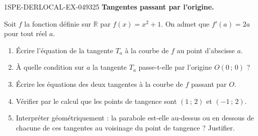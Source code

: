 \begin{exercice}{1SPE-DERLOCAL-EX-049}{3}{25}
\textbf{Tangentes passant par l'origine.}

Soit $f$ la fonction définie sur $\mathbb{R}$ par $f(x) = x^2 + 1$. On admet que $f'(a) = 2a$ pour tout réel $a$.

\begin{enumerate}
  \item Écrire l'équation de la tangente $T_a$ à la courbe de $f$ au point d'abscisse $a$.
  \item À quelle condition sur $a$ la tangente $T_a$ passe-t-elle par l'origine $O(0\,;\,0)$ ?
  \item Écrire les équations des deux tangentes à la courbe de $f$ passant par $O$.
  \item Vérifier par le calcul que les points de tangence sont $(1\,;\,2)$ et $(-1\,;\,2)$.
  \item Interpréter géométriquement : la parabole est-elle au-dessus ou en dessous de chacune de ces tangentes au voisinage du point de tangence ? Justifier.
\end{enumerate}
\end{exercice}
